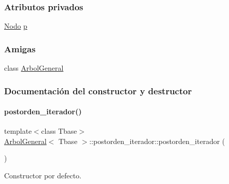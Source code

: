 \subsubsection*{Atributos privados}
\begin{DoxyCompactItemize}
\item 
\hyperlink{classArbolGeneral_a12cc1b74a9095d89bc7334290d332f7a}{Nodo} \hyperlink{classArbolGeneral_1_1postorden__iterador_ae269432023776674c7633eadeb8c30e0}{p}
\end{DoxyCompactItemize}
\subsubsection*{Amigas}
\begin{DoxyCompactItemize}
\item 
class \hyperlink{classArbolGeneral_1_1postorden__iterador_a9c06e31b7c3e0d4ee5b03003d32935a5}{Arbol\+General}
\end{DoxyCompactItemize}


\subsubsection{Documentación del constructor y destructor}
\hypertarget{classArbolGeneral_1_1postorden__iterador_a2ac2dbbaf71087cf7d5964b45b4bca1e}{}\label{classArbolGeneral_1_1postorden__iterador_a2ac2dbbaf71087cf7d5964b45b4bca1e} 
\paragraph{\texorpdfstring{postorden\+\_\+iterador()}{postorden\_iterador()}\hspace{0.1cm}{\footnotesize\ttfamily [1/3]}}
{\footnotesize\ttfamily template$<$class Tbase$>$ \\
\hyperlink{classArbolGeneral}{Arbol\+General}$<$ Tbase $>$\+::postorden\+\_\+iterador\+::postorden\+\_\+iterador (\begin{DoxyParamCaption}{ }\end{DoxyParamCaption})\hspace{0.3cm}{\ttfamily [inline]}}



Constructor por defecto. 

